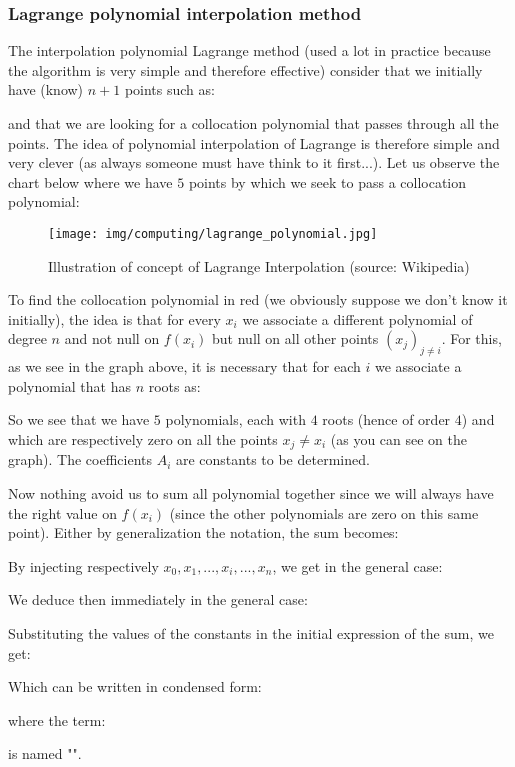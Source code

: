 	\pagebreak
	\subsubsection{Lagrange polynomial interpolation method}
	The interpolation  polynomial Lagrange method (used a lot in practice because the algorithm is very simple and therefore effective) consider that we initially have (know) $n + 1$ points such as:
	
	and that we are looking for a collocation polynomial that passes through all the points. The idea of polynomial interpolation of Lagrange is therefore simple and very clever (as always someone must have think to it first...). Let us observe the chart below where we have $5$ points by which we seek to pass a collocation polynomial:
	\begin{figure}[H]
		\centering
		\texttt{[image: img/computing/lagrange\_polynomial.jpg]}
		\caption{Illustration of concept of Lagrange Interpolation (source: Wikipedia)}
	\end{figure}
	To find the collocation polynomial in red (we obviously suppose we don't know it initially), the idea is that for every $x_i$ we associate a different polynomial of degree $n$ and not null on $f(x_i)$ but null on all other points $(x_j)_{j\neq i}$. For this, as we see in the graph above, it is necessary that for each $i$ we associate a polynomial that has $n$ roots as:
	
	So we see that we have $5$ polynomials, each with $4$ roots (hence of order $4$) and which are respectively zero on all the points $x_j\neq x_i$ (as you can see on the graph). The coefficients $A_i$ are constants to be determined.
	
	Now nothing avoid us to sum all polynomial together since we will always have the right value on $f(x_i)$ (since the other polynomials are zero on this same point). Either by generalization the notation, the sum becomes:
	
	By injecting respectively $x_0,x_1,...,x_i,...,x_n$, we get in the general case:
	
	We deduce then immediately in the general case:
	
	Substituting the values of the constants in the initial expression of the sum, we get:
	
	Which can be written in condensed form:
	
	where the term:
	
	is named "".
	
